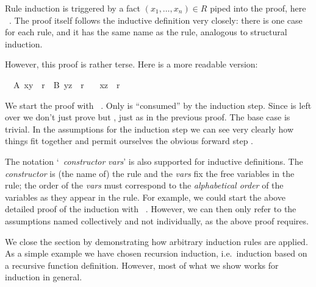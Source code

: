 \begin{isabellebody}
\isamarkupfalse%
\isamarkupfalse%
\isamarkupfalse%
\isamarkupfalse%
\isamarkupfalse%
\isamarkupfalse%
\isamarkupfalse%
\isamarkupfalse%
\isamarkupfalse%
\isamarkupfalse%
\isamarkupfalse%
%
\begin{isamarkuptext}%
\noindent Rule induction is triggered by a fact $(x_1,\dots,x_n)
\in R$ piped into the proof, here ~. The
proof itself follows the inductive definition very
closely: there is one case for each rule, and it has the same name as
the rule, analogous to structural induction.

However, this proof is rather terse. Here is a more readable version:%
\end{isamarkuptext}%
\isamarkuptrue%
\ \ A{\isacharcolon}\ {\isachardoublequote}{\isacharparenleft}x{\isacharcomma}y{\isacharparenright}\ {\isasymin}\ r{\isacharasterisk}{\isachardoublequote}\ \ B{\isacharcolon}\ {\isachardoublequote}{\isacharparenleft}y{\isacharcomma}z{\isacharparenright}\ {\isasymin}\ r{\isacharasterisk}{\isachardoublequote}\isanewline
\ \ \ {\isachardoublequote}{\isacharparenleft}x{\isacharcomma}z{\isacharparenright}\ {\isasymin}\ r{\isacharasterisk}{\isachardoublequote}\isanewline
\isamarkupfalse%
\isamarkupfalse%
\isamarkupfalse%
\isamarkupfalse%
\isamarkupfalse%
\isamarkupfalse%
\isamarkupfalse%
\isamarkupfalse%
\isamarkupfalse%
\isamarkupfalse%
\isamarkupfalse%
\isamarkupfalse%
\isamarkupfalse%
\isamarkupfalse%
\isamarkupfalse%
\isamarkupfalse%
\isamarkupfalse%
%
\begin{isamarkuptext}%
\noindent We start the proof with ~. Only  is ``consumed'' by the induction step.
Since  is left over we don't just prove  but , just as in the previous proof. The
base case is trivial. In the assumptions for the induction step we can
see very clearly how things fit together and permit ourselves the
obvious forward step .

The notation `~\isa{(}\emph{constructor} \emph{vars}\isa{)}'
is also supported for inductive definitions. The \emph{constructor} is (the
name of) the rule and the \emph{vars} fix the free variables in the
rule; the order of the \emph{vars} must correspond to the
\emph{alphabetical order} of the variables as they appear in the rule.
For example, we could start the above detailed proof of the induction
with ~. However, we can then only
refer to the assumptions named  collectively and not
individually, as the above proof requires.%
\end{isamarkuptext}%
\isamarkuptrue%
%
\isamarkuptrue%
%
\begin{isamarkuptext}%
We close the section by demonstrating how arbitrary induction
rules are applied. As a simple example we have chosen recursion
induction, i.e.\ induction based on a recursive function
definition. However, most of what we show works for induction in
general.


\end{isamarkuptext}
\end{isabellebody}
